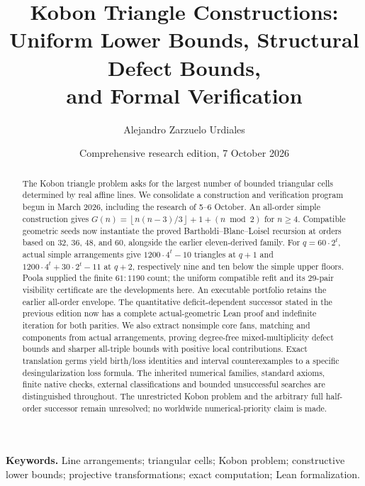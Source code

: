 \documentclass[11pt,a4paper]{article}
\title{Kobon Triangle Constructions:\\Uniform Lower Bounds, Structural Defect Bounds,\\and Formal Verification}
\author{Alejandro Zarzuelo Urdiales}
\date{Comprehensive research edition, 7 October 2026}
\theoremstyle{definition}
\theoremstyle{remark}
\newcommand{\floor}[1]{\left\lfloor#1\right\rfloor}
\begin{document}
\maketitle
\begin{abstract}
The Kobon triangle problem asks for the largest number of bounded triangular cells determined by real affine lines. We consolidate a construction and verification program begun in March 2026, including the research of 5--6 October. An all-order simple construction gives $G(n)=\floor{n(n-3)/3}+1+(n\bmod2)$ for $n\ge4$. Compatible geometric seeds now instantiate the proved Bartholdi--Blanc--Loisel recursion at orders based on $32$, $36$, $48$, and $60$, alongside the earlier eleven-derived family. For $q=60\cdot2^t$, actual simple arrangements give $1200\cdot4^t-10$ triangles at $q+1$ and $1200\cdot4^t+30\cdot2^t-11$ at $q+2$, respectively nine and ten below the simple upper floors. Poola supplied the finite $61:1190$ count; the uniform compatible refit and its 29-pair visibility certificate are the developments here. An executable portfolio retains the earlier all-order envelope. The quantitative deficit-dependent successor stated in the previous edition now has a complete actual-geometric Lean proof and indefinite iteration for both parities. We also extract nonsimple core fans, matching and components from actual arrangements, proving degree-free mixed-multiplicity defect bounds and sharper all-triple bounds with positive local contributions. Exact translation germs yield birth/loss identities and interval counterexamples to a specific desingularization loss formula. The inherited numerical families, standard axioms, finite native checks, external classifications and bounded unsuccessful searches are distinguished throughout. The unrestricted Kobon problem and the arbitrary full half-order successor remain unresolved; no worldwide numerical-priority claim is made.
\end{abstract}
\vspace{0.4em}
\noindent\textbf{Keywords.} Line arrangements; triangular cells; Kobon problem; constructive lower bounds; projective transformations; exact computation; Lean formalization.
\clearpage
\tableofcontents
\clearpage














\clearpage
\appendix

\end{document}
